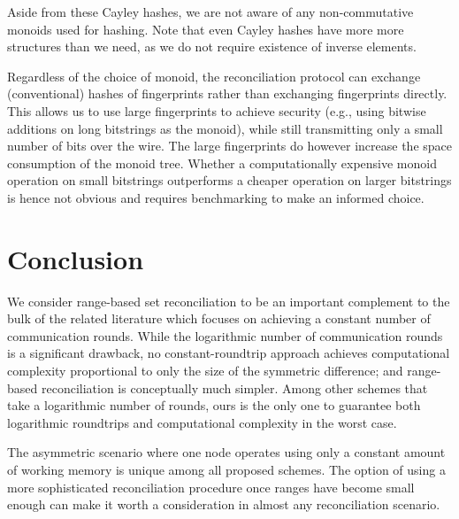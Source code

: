 \documentclass[conference]{IEEEtran}
\begin{document}

Aside from these Cayley hashes, we are not aware of any non-commutative monoids used for hashing. Note that even Cayley hashes have more more structures than we need, as we do not require existence of inverse elements.

Regardless of the choice of monoid, the reconciliation protocol can exchange (conventional) hashes of fingerprints rather than exchanging fingerprints directly. This allows us to use large fingerprints to achieve security (e.g., using bitwise additions on long bitstrings as the monoid), while still transmitting only a small number of bits over the wire. The large fingerprints do however increase the space consumption of the monoid tree. Whether a computationally expensive monoid operation on small bitstrings outperforms a cheaper operation on larger bitstrings is hence not obvious and requires benchmarking to make an informed choice.

\section{Conclusion}\label{conclusion}

We consider range-based set reconciliation to be an important complement to the bulk of the related literature which focuses on achieving a constant number of communication rounds. While the logarithmic number of communication rounds is a significant drawback, no constant-roundtrip approach achieves computational complexity proportional to only the size of the symmetric difference; and range-based reconciliation is conceptually much simpler. Among other schemes that take a logarithmic number of rounds, ours is the only one to guarantee both logarithmic roundtrips and computational complexity in the worst case.

The asymmetric scenario where one node operates using only a constant amount of working memory is unique among all proposed schemes. The option of using a more sophisticated reconciliation procedure once ranges have become small enough can make it worth a consideration in almost any reconciliation scenario.
\end{document}
